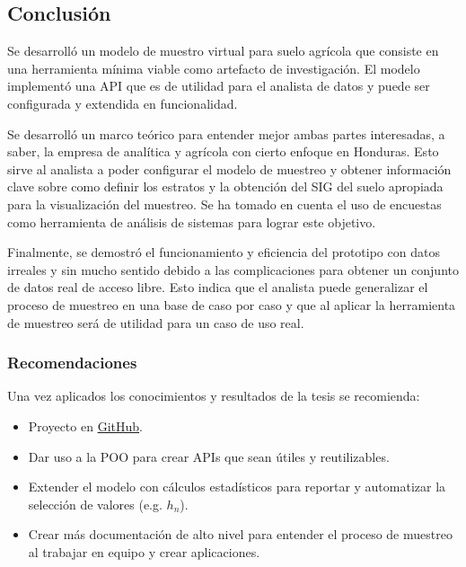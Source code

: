 %
%

\subsection{Conclusión}

Se desarrolló un modelo de muestro virtual para suelo agrícola que consiste en una herramienta mínima viable como artefacto de investigación. El modelo implementó una API que es de utilidad para el analista de datos y puede ser configurada y extendida en funcionalidad.

\bigbreak

Se desarrolló un marco teórico para entender mejor ambas partes interesadas, a saber, la empresa de analítica y agrícola con cierto enfoque en Honduras. Esto sirve al analista a poder configurar el modelo de muestreo y obtener información clave sobre como definir los estratos y la obtención del SIG del suelo apropiada para la visualización del muestreo. Se ha tomado en cuenta el uso de encuestas como herramienta de análisis de sistemas para lograr este objetivo.

\bigbreak

Finalmente, se demostró el funcionamiento y eficiencia del prototipo con datos irreales y sin mucho sentido debido a las complicaciones para obtener un conjunto de datos real de acceso libre. Esto indica que el analista puede generalizar el proceso de muestreo en una base de caso por caso y que al aplicar la herramienta de muestreo será de utilidad para un caso de uso real.

\subsubsection{Recomendaciones}

Una vez aplicados los conocimientos y resultados de la tesis se recomienda:

\begin{itemize}
    \item Proyecto en \href{https://github.com/tobiasbriones/cp-unah-mm700-agricultural-soil-sampling-for-data-analysis}{GitHub}.

    \item Dar uso a la POO para crear APIs que sean útiles y reutilizables.

    \item Extender el modelo con cálculos estadísticos para reportar y automatizar la selección de valores (e.g. $h_n$).

    \item Crear más documentación de alto nivel para entender el proceso de muestreo al trabajar en equipo y crear aplicaciones.
\end{itemize}
